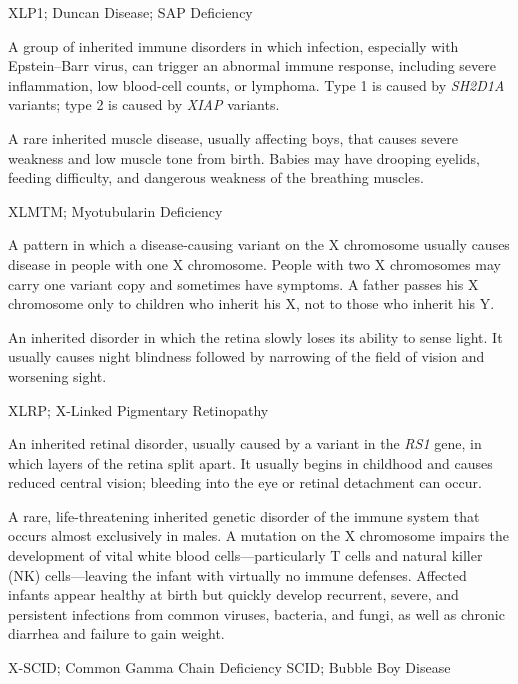 \synonyms
XLP1; Duncan Disease; SAP Deficiency

 A group of inherited immune disorders in which infection, especially with Epstein--Barr virus, can trigger an abnormal immune response, including severe inflammation, low blood-cell counts, or lymphoma. Type 1 is caused by \textit{SH2D1A} variants; type 2 is caused by \textit{XIAP} variants.

 A rare inherited muscle disease, usually affecting boys, that causes severe weakness and low muscle tone from birth. Babies may have drooping eyelids, feeding difficulty, and dangerous weakness of the breathing muscles.

\synonyms
XLMTM; Myotubularin Deficiency

 A pattern in which a disease-causing variant on the X chromosome usually causes disease in people with one X chromosome. People with two X chromosomes may carry one variant copy and sometimes have symptoms. A father passes his X chromosome only to children who inherit his X, not to those who inherit his Y.

 An inherited disorder in which the retina slowly loses its ability to sense light. It usually causes night blindness followed by narrowing of the field of vision and worsening sight.

\synonyms
XLRP; X-Linked Pigmentary Retinopathy

 An inherited retinal disorder, usually caused by a variant in the \textit{RS1} gene, in which layers of the retina split apart. It usually begins in childhood and causes reduced central vision; bleeding into the eye or retinal detachment can occur.

 A rare, life-threatening inherited genetic disorder of the immune system that occurs almost exclusively in males. A mutation on the X chromosome impairs the development of vital white blood cells---particularly T cells and natural killer (NK) cells---leaving the infant with virtually no immune defenses. Affected infants appear healthy at birth but quickly develop recurrent, severe, and persistent infections from common viruses, bacteria, and fungi, as well as chronic diarrhea and failure to gain weight.

\synonyms
X-SCID; Common Gamma Chain Deficiency SCID; Bubble Boy Disease

